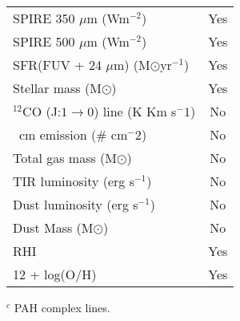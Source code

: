 \begin{table}
\begin{tabular}{ |l|c| }
SPIRE 350 $\mu$m (Wm$^{-2}$)& Yes\\
SPIRE 500 $\mu$m (Wm$^{-2}$)& Yes\\
SFR(FUV + 24 $\mu$m) (M$\odot$yr$^{-1}$) & Yes\\
Stellar mass (M$\odot$)& Yes\\
$^{12}$CO (J:$1\rightarrow0$) line (K Km s$^-1$) & No \\
\hi 21~cm emission ($\#$ cm$^-2$) & No \\
Total gas mass (M$\odot$) & No \\
TIR luminosity (erg s$^{-1}$) & No \\
Dust luminosity (erg s$^{-1}$) & No \\
Dust Mass (M$\odot$)& No\\
RHI & Yes\\
12 + log(O/H)& Yes\\
\hline
\end{tabular}
\begin{tablenotes}
\item $^c$ PAH complex lines.
\end{tablenotes}
\end{table}